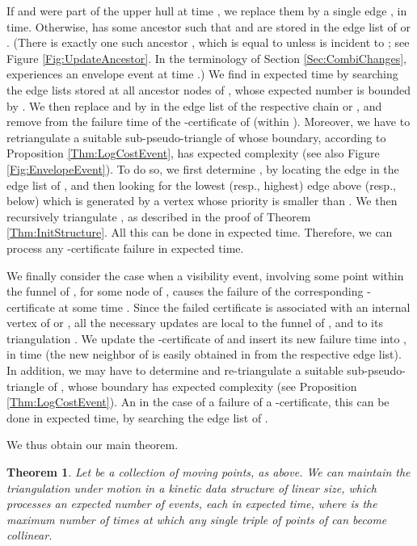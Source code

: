 \documentclass[11pt]{article}
\newtheorem{theorem}{Theorem}[section]
\begin{document}
If  and  were part of the upper hull at time , we replace them by a single edge , in  time.
Otherwise,  has some ancestor  such that  and  are stored in the edge list of
 or . (There is exactly one such ancestor , which is equal to  unless  is incident to ; see Figure \ref{Fig:UpdateAncestor}. In the terminology of Section \ref{Sec:CombiChanges},  experiences an envelope event at time .)
We find  in  expected time by searching the edge lists stored at all ancestor nodes of , whose expected number is bounded by . We then replace  and  by  in the edge list of the respective chain  or , and remove from  the failure
time of the -certificate of  (within ).  Moreover, we have
to retriangulate a suitable sub-pseudo-triangle  of 
whose boundary, according to Proposition \ref{Thm:LogCostEvent}, has
expected complexity  (see also Figure \ref{Fig:EnvelopeEvent}).  To do so, we first determine ,
by locating the edge  in the edge list of , and then looking for
the lowest (resp., highest) edge above (resp., below)  which is generated by a vertex whose priority is smaller than .
We then recursively
triangulate , as described in the proof of Theorem
\ref{Thm:InitStructure}. All this can be done in  expected
time.  Therefore, we can process any
-certificate failure in  expected time.

\smallskip
{} We finally consider the case when a visibility event, involving some point  within the funnel of ,
for some node  of
, causes the failure of the corresponding -certificate at some time .  Since the failed certificate is associated with an
internal vertex of  or , all the necessary
updates are local to the funnel of , and to its triangulation
.  We update the -certificate of  and insert its
new failure time into , in  time (the new neighbor of  is easily obtained in  from the respective edge list). In addition, we may
have to determine and re-triangulate a suitable sub-pseudo-triangle
 of , whose boundary has expected complexity  (see Proposition \ref{Thm:LogCostEvent}). An in the case of a failure of a -certificate, this can be done in  expected time, by searching the edge list of .





We thus obtain our main theorem.
\begin{theorem}\label{MainTheorem}
Let  be a collection of  moving points, as above. We can maintain the triangulation  under motion in a kinetic data structure of linear size, which processes an expected number of  events, each in  expected time, where  is the maximum number of times at which any single triple of points of  can become collinear. 
\end{theorem}
\end{document}
